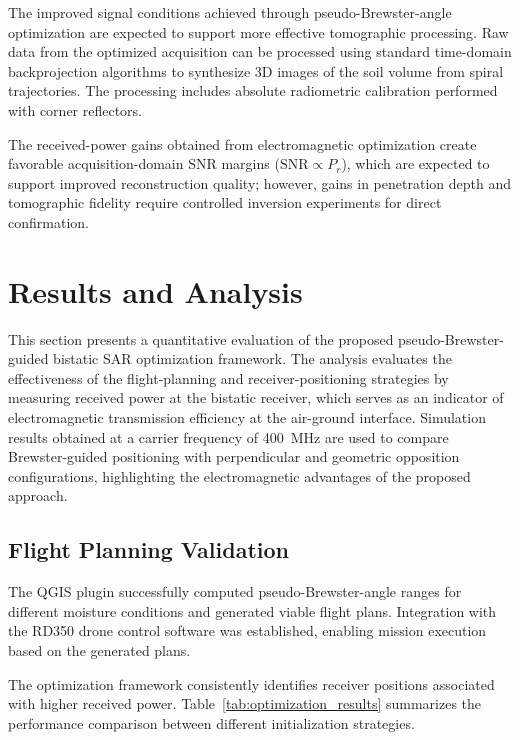 \documentclass[conference]{IEEEtran}
\begin{document}
The improved signal conditions achieved through pseudo-Brewster-angle optimization are expected to support more effective tomographic processing. Raw data from the optimized acquisition can be processed using standard time-domain backprojection algorithms to synthesize 3D images of the soil volume from spiral trajectories. The processing includes absolute radiometric calibration performed with corner reflectors.

The received-power gains obtained from electromagnetic optimization create favorable acquisition-domain SNR margins ($\mathrm{SNR} \propto P_r$), which are expected to support improved reconstruction quality; however, gains in penetration depth and tomographic fidelity require controlled inversion experiments for direct confirmation.

\section{Results and Analysis}

This section presents a quantitative evaluation of the proposed pseudo-Brewster-guided bistatic SAR optimization framework. The analysis evaluates the effectiveness of the flight-planning and receiver-positioning strategies by measuring received power at the bistatic receiver, which serves as an indicator of electromagnetic transmission efficiency at the air-ground interface. Simulation results obtained at a carrier frequency of 400~MHz are used to compare Brewster-guided positioning with perpendicular and geometric opposition configurations, highlighting the electromagnetic advantages of the proposed approach.

\subsection{Flight Planning Validation}

The QGIS plugin successfully computed pseudo-Brewster-angle ranges for different moisture conditions and generated viable flight plans. Integration with the RD350 drone control software was established, enabling mission execution based on the generated plans.

The optimization framework consistently identifies receiver positions associated with higher received power. Table~\ref{tab:optimization_results} summarizes the performance comparison between different initialization strategies.
\end{document}

